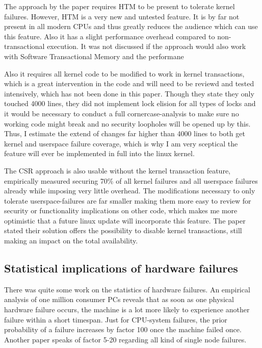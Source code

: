 \documentclass[a4paper,10pt,twoside]{article}
\begin{document}
The approach by the paper requires HTM to be present to tolerate kernel failures. However, HTM is a very new and untested feature. It is by far not present in all modern CPUs and thus greatly reduces the audience which can use this feature. Also it has a slight performance overhead compared to non-transactional execution. It was not discussed if the approach would also work with Software Transactional Memory and the performane

Also it requires all kernel code to be modified to work in kernel transactions, which is a great intervention in the code and will need to be reviewd and tested intensively, which has not been done in this paper. Though they state they only touched 4000 lines, they did not implement lock elision for all types of locks and it would be necessary to conduct a full cornercase-analysis to make sure no working code might break and no security loopholes will be opened up by this. Thus, I estimate the extend of changes far higher than 4000 lines to both get kernel and userspace failure coverage, which is why I am very sceptical the feature will ever be implemented in full into the linux kernel.

The CSR approach is also usable without the kernel transaction feature, empirically measured securing 70\% of all kernel failures and all userspace failures already while imposing very little overhead. The modifications necessary to only tolerate userspace-failures are far smaller making them more easy to review for security or functionality implications on other code, which makes me more optimistic that a future linux update will incorporate this feature. The paper stated their solution offers the possibility to disable kernel transactions, still making an impact on the total availability.

\subsection{Statistical implications of hardware failures}
There was quite some work on the statistics of hardware failures. An empirical analysis of one million consumer PCs \cite{Microsoftfailures} reveals that as soon as one physical hardware failure occurs, the machine is a lot more likely to experience another failure within a short timespan. Just for CPU-system failures, the prior probability of a failure increases by factor 100 once the machine failed once. Another paper \cite{HPCfailures} speaks of factor 5-20 regarding all kind of single node failures. 
\end{document}
